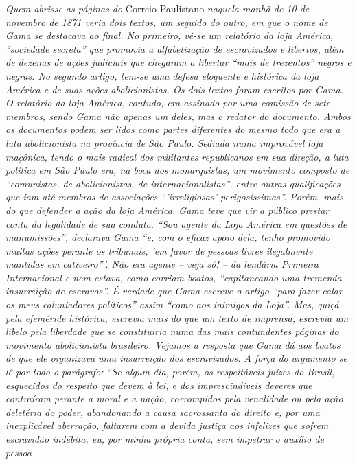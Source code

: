 {\begin{didascalia}
\emph{Quem abrisse as páginas do} Correio Paulistano \emph{naquela manhã
de 10 de novembro de 1871 veria dois textos, um seguido do outro, em que
o nome de Gama se destacava ao final. No primeiro, vê-se um relatório da
loja América, ``sociedade secreta'' que promovia a alfabetização de
escravizados e libertos, além de dezenas de ações judiciais que chegaram
a libertar ``mais de trezentos'' negros e negras. No segundo artigo,
tem-se uma defesa eloquente e histórica da loja América e de suas ações
abolicionistas. Os dois textos foram escritos por Gama. O relatório da
loja América, contudo, era assinado por uma comissão de sete membros,
sendo Gama não apenas um deles, mas o redator do documento. Ambos os
documentos podem ser lidos como partes diferentes do mesmo todo que era
a luta abolicionista na província de São Paulo. Sediada numa improvável
loja maçônica, tendo o mais radical dos militantes republicanos em sua
direção, a luta política em São Paulo era, na boca dos monarquistas, um
movimento composto de ``comunistas, de abolicionistas, de
internacionalistas'', entre outras qualificações que iam até membros de
associações ``'irreligiosas' perigosíssimas''. Porém, mais do que defender
a ação da loja América, Gama teve que vir a público prestar conta da
legalidade de sua conduta. ``Sou agente da Loja América em questões de
manumissões'', declarava Gama ``e, com o eficaz apoio dela, tenho
promovido muitas ações perante os tribunais, 'em favor de pessoas livres
ilegalmente mantidas em cativeiro'''. Não era agente -- veja só! -- da
lendária Primeira Internacional e nem estava, como corriam boatos,
``capitaneando uma tremenda insurreição de escravos''. É verdade que Gama
escreve o artigo ``para fazer calar os meus caluniadores políticos'' assim
``como aos inimigos da Loja''. Mas, quiçá pela efeméride histórica,
escrevia mais do que um texto de imprensa, escrevia um libelo pela
liberdade que se constituiria numa das mais contundentes páginas do
movimento abolicionista brasileiro. Vejamos a resposta que Gama dá aos
boatos de que ele organizava uma insurreição dos escravizados. A força
do argumento se lê por todo o parágrafo: ``Se algum dia, porém, os
respeitáveis juízes do Brasil, esquecidos do respeito que devem à lei, e
dos imprescindíveis deveres que contraíram perante a moral e a nação,
corrompidos pela venalidade ou pela ação deletéria do poder, abandonando
a causa sacrossanta do direito e, por uma inexplicável aberração,
faltarem com a devida justiça aos infelizes que sofrem escravidão
indébita, eu, por minha própria conta, sem impetrar o auxílio de pessoa
}
\end{didascalia}}
